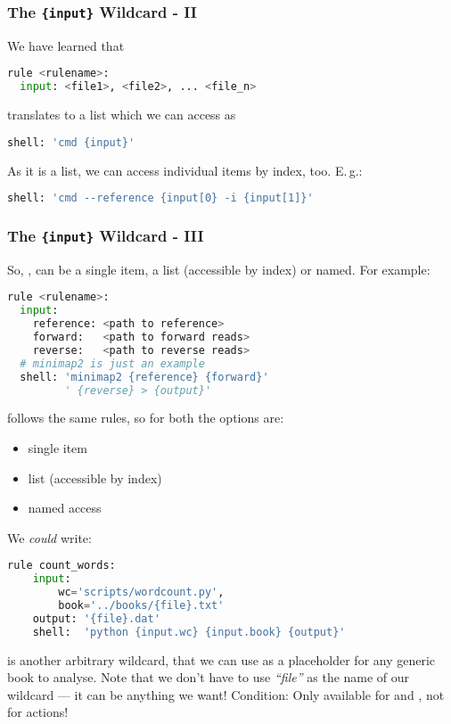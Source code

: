 \begin{frame}[fragile]
  \frametitle{The \texttt{\{input\}} Wildcard - II}
  We have learned that
  \begin{lstlisting}[language=Python,style=Python]
rule <rulename>:
  input: <file1>, <file2>, ... <file_n>
  \end{lstlisting}
  translates to a list which we can access as
  \begin{lstlisting}[language=Python,style=Python]
  shell: 'cmd {input}'
  \end{lstlisting}
  As it is a list, we can access individual items by index, too. E.\,g.:
  \begin{lstlisting}[language=Python,style=Python]
  shell: 'cmd --reference {input[0} -i {input[1]}'
  \end{lstlisting}
\end{frame}

\begin{frame}[fragile]
  \frametitle{The  \texttt{\{input\}} Wildcard - III}
  So, , can be a single item, a list (accessible by index) or named. For example:
  \begin{lstlisting}[language=Python,style=Python]
rule <rulename>:
  input:
    reference: <path to reference>
    forward:   <path to forward reads>
    reverse:   <path to reverse reads>
  # minimap2 is just an example
  shell: 'minimap2 {reference} {forward}' 
         ' {reverse} > {output}'
  \end{lstlisting}
  \pause
   follows the same rules, so for both the options are:
  \begin{itemize}
   \item single item
   \item list (accessible by index)
   \item named access
  \end{itemize}
\end{frame}

\begin{frame}[fragile]
  We \emph{could} write:
  \begin{lstlisting}[language=Python,style=Python]
rule count_words:
    input:
        wc='scripts/wordcount.py',
        book='../books/{file}.txt'
    output: '{file}.dat'
    shell:  'python {input.wc} {input.book} {output}'
  \end{lstlisting}
  \begin{explanation}
  	 is another arbitrary wildcard, that we can use as a placeholder for any generic book to analyse. Note that we don’t have to use \emph{``file''} as the name of our wildcard — it can be anything we want! Condition: Only available for  and , not for actions!
  \end{explanation}
\end{frame}

